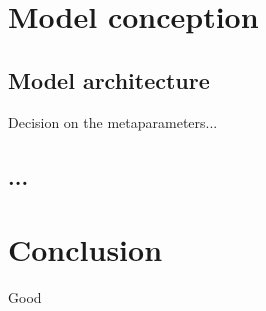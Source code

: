 \documentclass[paper=a4, fontsize=11pt]{scrartcl}
\begin{document}

\newpage


\newpage

\renewcommand{\contentsname}{Table of contents}
\tableofcontents
\newpage


\newpage


\newpage


\newpage

\section{Model conception}

\subsection{Model architecture}

Decision on the metaparameters...

\subsection{...}
\newpage

\section{Conclusion}
Good
\newpage

\printbibliography[heading=bibintoc, title={Bibliography}]
\newpage


\listoffigures

\listoftables


\end{document}
